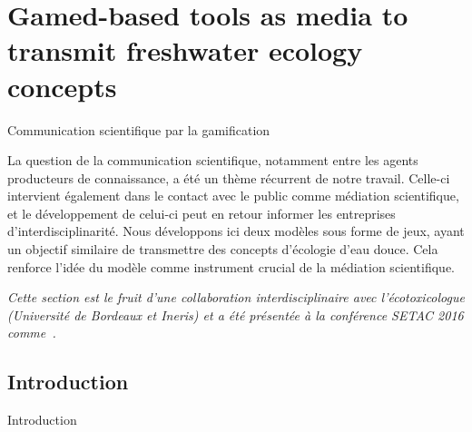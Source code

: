 


\newpage


\section{Gamed-based tools as media to transmit freshwater ecology concepts}{Communication scientifique par la gamification}

\label{app:sec:mediationecotox}



La question de la communication scientifique, notamment entre les agents producteurs de connaissance, a été un thème récurrent de notre travail. Celle-ci intervient également dans le contact avec le public comme médiation scientifique, et le développement de celui-ci peut en retour informer les entreprises d'interdisciplinarité. Nous développons ici deux modèles sous forme de jeux, ayant un objectif similaire de transmettre des concepts d'écologie d'eau douce. Cela renforce l'idée du modèle comme instrument crucial de la médiation scientifique.


\stars

\textit{Cette section est le fruit d'une collaboration interdisciplinaire avec l'écotoxicologue  (Université de Bordeaux et Ineris) et a été présentée à la conférence SETAC 2016 comme~\cite{serra:halshs-01322860}.}


\stars



\subsection{Introduction}{Introduction}

